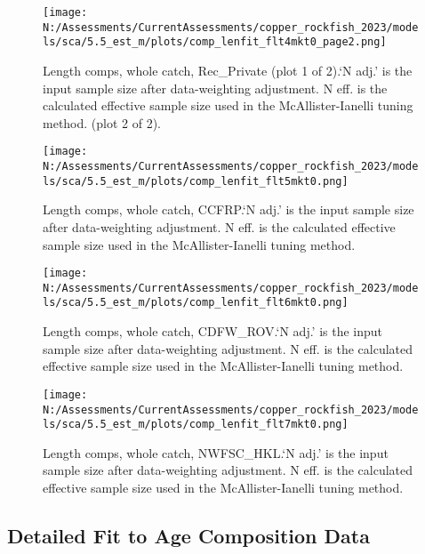 \documentclass[11pt,
  english,
  letterpaper,
]{article}
\begin{document}
\begin{figure}
\centering
\texttt{[image: N:/Assessments/CurrentAssessments/copper\_rockfish\_2023/models/sca/5.5\_est\_m/plots/comp\_lenfit\_flt4mkt0\_page2.png]}
\caption{Length comps, whole catch, Rec\_Private (plot 1 of 2).`N adj.' is the input sample size after data-weighting adjustment. N eff. is the calculated effective sample size used in the McAllister-Ianelli tuning method. (plot 2 of 2).\label{fig:comp_lenfit_flt4mkt0_page2}}
\end{figure}

\begin{figure}
\centering
\texttt{[image: N:/Assessments/CurrentAssessments/copper\_rockfish\_2023/models/sca/5.5\_est\_m/plots/comp\_lenfit\_flt5mkt0.png]}
\caption{Length comps, whole catch, CCFRP.`N adj.' is the input sample size after data-weighting adjustment. N eff. is the calculated effective sample size used in the McAllister-Ianelli tuning method.\label{fig:comp_lenfit_flt5mkt0}}
\end{figure}

\begin{figure}
\centering
\texttt{[image: N:/Assessments/CurrentAssessments/copper\_rockfish\_2023/models/sca/5.5\_est\_m/plots/comp\_lenfit\_flt6mkt0.png]}
\caption{Length comps, whole catch, CDFW\_ROV.`N adj.' is the input sample size after data-weighting adjustment. N eff. is the calculated effective sample size used in the McAllister-Ianelli tuning method.\label{fig:comp_lenfit_flt6mkt0}}
\end{figure}

\begin{figure}
\centering
\texttt{[image: N:/Assessments/CurrentAssessments/copper\_rockfish\_2023/models/sca/5.5\_est\_m/plots/comp\_lenfit\_flt7mkt0.png]}
\caption{Length comps, whole catch, NWFSC\_HKL.`N adj.' is the input sample size after data-weighting adjustment. N eff. is the calculated effective sample size used in the McAllister-Ianelli tuning method.\label{fig:comp_lenfit_flt7mkt0}}
\end{figure}

\newpage

\hypertarget{age-data}{%
\subsection{Detailed Fit to Age Composition Data}\label{age-data}}
\end{document}

